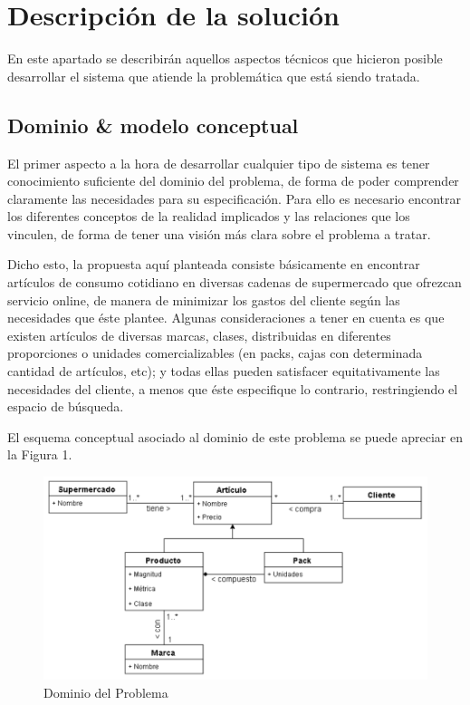 \documentclass[12pt]{article} %
\begin{document}

\section{Descripción de la solución}

En este apartado se describirán aquellos aspectos técnicos que hicieron posible desarrollar el sistema que atiende la problemática que está siendo tratada.


\subsection{Dominio \& modelo conceptual} 

El primer aspecto a la hora de desarrollar cualquier tipo de sistema es tener conocimiento suficiente del dominio del problema, de forma de poder comprender claramente las necesidades para su especificación. Para ello es necesario encontrar los diferentes conceptos de la realidad implicados y las relaciones que los vinculen, de forma de tener una visión más clara sobre el problema a tratar.

Dicho esto, la propuesta aquí planteada consiste básicamente en encontrar artículos de consumo cotidiano en diversas cadenas de supermercado que ofrezcan servicio online, de manera de minimizar los gastos del cliente según las necesidades que éste plantee. Algunas consideraciones a tener en cuenta es que existen artículos de diversas marcas, clases, distribuidas en diferentes proporciones o unidades comercializables (en packs, cajas con determinada cantidad de artículos, etc); y todas ellas pueden satisfacer equitativamente las necesidades del cliente, a menos que éste especifique lo contrario, restringiendo el espacio de búsqueda.

El esquema conceptual asociado al dominio de este problema se puede apreciar en la Figura 1.

\begin{figure}[H]
\includegraphics[height=0.30\textwidth]{dominio}
\centering
\caption{Dominio del Problema}
\end{figure}
\end{document}

